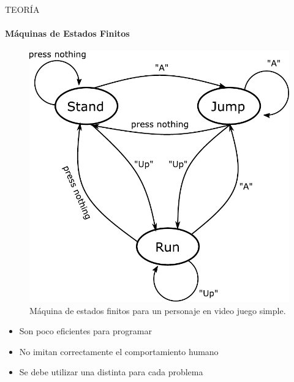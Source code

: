 \begin{frame}{TEORÍA}
    \framesubtitle{Máquinas de Estados Finitos}
    \begin{figure}[H]
        \centering
        \includegraphics[scale=0.3]{files/Finite.pdf}
        \caption{Máquina de estados finitos para un personaje en video juego simple\footnotemark{}.}
    \end{figure}
    \begin{itemize}
        \item Son poco eficientes para programar
        \item No imitan correctamente el comportamiento humano
        \item Se debe utilizar una distinta para cada problema
    \end{itemize}
\end{frame}

